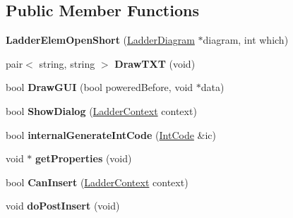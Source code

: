 \subsection*{Public Member Functions}
\begin{DoxyCompactItemize}
\item 
\hypertarget{class_ladder_elem_open_short_af1822c9fc1834edaff46fc31b5bafa9d}{{\bfseries Ladder\-Elem\-Open\-Short} (\hyperlink{class_ladder_diagram}{Ladder\-Diagram} $\ast$diagram, int which)}\label{class_ladder_elem_open_short_af1822c9fc1834edaff46fc31b5bafa9d}

\item 
\hypertarget{class_ladder_elem_open_short_a00862d473310b4db45e0b49425c68d21}{pair$<$ string, string $>$ {\bfseries Draw\-T\-X\-T} (void)}\label{class_ladder_elem_open_short_a00862d473310b4db45e0b49425c68d21}

\item 
\hypertarget{class_ladder_elem_open_short_a3380096b2435b953fe1005ee560b2240}{bool {\bfseries Draw\-G\-U\-I} (bool powered\-Before, void $\ast$data)}\label{class_ladder_elem_open_short_a3380096b2435b953fe1005ee560b2240}

\item 
\hypertarget{class_ladder_elem_open_short_ad8f2de001973fc4ade29e1d34ab19777}{bool {\bfseries Show\-Dialog} (\hyperlink{struct_ladder_context}{Ladder\-Context} context)}\label{class_ladder_elem_open_short_ad8f2de001973fc4ade29e1d34ab19777}

\item 
\hypertarget{class_ladder_elem_open_short_a80e73eb00806593816293ed513464cc5}{bool {\bfseries internal\-Generate\-Int\-Code} (\hyperlink{class_int_code}{Int\-Code} \&ic)}\label{class_ladder_elem_open_short_a80e73eb00806593816293ed513464cc5}

\item 
\hypertarget{class_ladder_elem_open_short_a9cee8ad1ce9ebcd946d5fc7051967318}{void $\ast$ {\bfseries get\-Properties} (void)}\label{class_ladder_elem_open_short_a9cee8ad1ce9ebcd946d5fc7051967318}

\item 
\hypertarget{class_ladder_elem_open_short_aa3e46c028eb95f18cf845cb565ea0798}{bool {\bfseries Can\-Insert} (\hyperlink{struct_ladder_context}{Ladder\-Context} context)}\label{class_ladder_elem_open_short_aa3e46c028eb95f18cf845cb565ea0798}

\item 
\hypertarget{class_ladder_elem_open_short_a59e4c2ea5272f85aef3f44c1b354f31e}{void {\bfseries do\-Post\-Insert} (void)}\label{class_ladder_elem_open_short_a59e4c2ea5272f85aef3f44c1b354f31e}


\end{DoxyCompactItemize}
